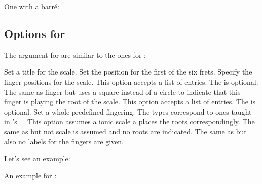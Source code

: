 \documentclass[toc=index,toc=bib]{cnpkgdoc}
\begin{document}
One with a barr\'e:

\begin{beispiel}
 \chordscheme[
   name      = Gmi\textsuperscript{7} ,
   position  = II ,
   barre     = 2/2-4:3 ,
   show-root = 4/4 ,
   root      = 2/6:2 ,
   mute      = {1,5}
 ]
\end{beispiel}

\subsection{Options for }
The  argument for  are similar to the ones for
:
\begin{beschreibung}
 \newline
   Set a title for the scale.
 \newline
   Set the position for the first of the six frets.
 \newline
   Specify the finger positions for the scale. This option accepts a list of entries.
   The  is optional.
 \newline
   The same as finger but uses a square instead of a circle to indicate that
   this finger is playing the root of the scale. This option accepts a list of
   entries. The  is optional.
 \newline
   Set a whole predefined fingering. The types correspond to ones taught
   in \citeauthor{leavitt:mmfg:1}'s ~\cite{leavitt:mmfg:1}.
   This option assumes a ionic scale a places the roots correspondingly.
 \newline
   The same as  but not scale is assumed and no roots are
   indicated.
  \newline
   The same as  but also no labels for the fingers are given.
\end{beschreibung}

Let's see an example:
\begin{beispiel}[below]
 \scales[
   name      = F-major (Fingering Type~1A) ,
   position  = I ,
   fingering = type 1A
 ]
\end{beispiel}

An example for :
\begin{beispiel}[below]
 \scales[
   name       = Fingering Type~3 ,
   fingering* = type 3
 ]
\end{beispiel}
\end{document}
